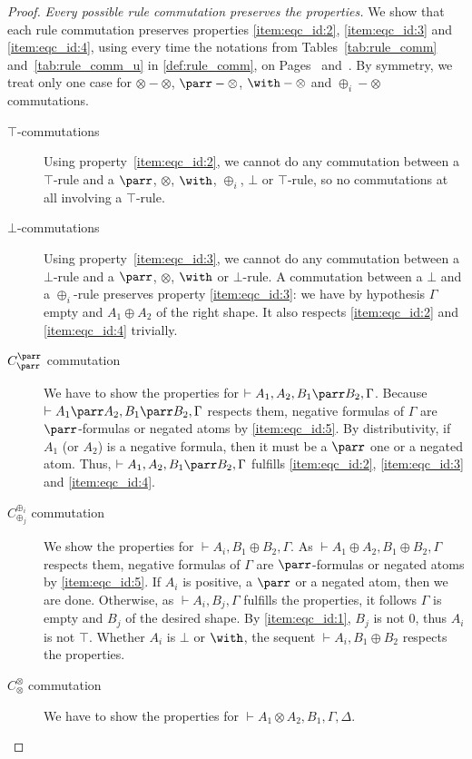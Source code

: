 \documentclass{lmcs}
\newcommand*{\tens}{\otimes} %
\renewcommand*{\fCenter}{\vdash} %
\newcommand{\comm}[2]{C_{#1}^{#2}} %
\newcommand*{\proofpar}[1]{\textit{#1}}
\begin{document}
\begin{proof}
\proofpar{Every possible rule commutation preserves the properties.}
We show that each rule commutation preserves properties \ref{item:eqc_id:2}, \ref{item:eqc_id:3} and \ref{item:eqc_id:4}, using every time the notations from Tables~\ref{tab:rule_comm} and~\ref{tab:rule_comm_u} in \autoref{def:rule_comm}, on Pages~\pageref{tab:rule_comm} and~\pageref{tab:rule_comm_u}.
By symmetry, we treat only one case for $\tens-\tens$, $\parr-\tens$, $\with-\tens$ and $\oplus_i-\tens$ commutations.
\begin{description}
\item[$\top$-commutations]
Using property~\ref{item:eqc_id:2}, we cannot do any commutation between a $\top$-rule and a $\parr$, $\tens$, $\with$, $\oplus_i$, $\bot$ or $\top$-rule, so no commutations at all involving a $\top$-rule.
\item[$\bot$-commutations]
Using property~\ref{item:eqc_id:3}, we cannot do any commutation between a $\bot$-rule and a $\parr$, $\tens$, $\with$ or $\bot$-rule.
A commutation between a $\bot$ and a $\oplus_i$-rule preserves property \ref{item:eqc_id:3}: we have by hypothesis $\Gamma$ empty and $A_1\oplus A_2$ of the right shape.
It also respects \ref{item:eqc_id:2} and \ref{item:eqc_id:4} trivially.
\item[$\comm{\parr}{\parr}$ commutation]
We have to show the properties for $\fCenter A_1,A_2,B_1\parr B_2,\Gamma$.
Because $\fCenter A_1\parr A_2,B_1\parr B_2,\Gamma$ respects them, negative formulas of $\Gamma$ are $\parr$-formulas or negated atoms by \ref{item:eqc_id:5}.
By distributivity, if $A_1$ (or $A_2$) is a negative formula, then it must be a $\parr$ one or a negated atom.
Thus, $\fCenter A_1,A_2,B_1\parr B_2,\Gamma$ fulfills \ref{item:eqc_id:2}, \ref{item:eqc_id:3} and \ref{item:eqc_id:4}.
\item[$\comm{\oplus_j}{\oplus_i}$ commutation]
We show the properties for $\fCenter A_i,B_1\oplus B_2,\Gamma$.
As $\fCenter A_1\oplus A_2,B_1\oplus B_2,\Gamma$ respects them, negative formulas of $\Gamma$ are $\parr$-formulas or negated atoms by \ref{item:eqc_id:5}.
If $A_i$ is positive, a $\parr$ or a negated atom, then we are done.
Otherwise, as $\fCenter A_i,B_j,\Gamma$ fulfills the properties, it follows $\Gamma$ is empty and $B_j$ of the desired shape.
By \ref{item:eqc_id:1}, $B_j$ is not $0$, thus $A_i$ is not $\top$.
Whether $A_i$ is $\bot$ or $\with$, the sequent $\fCenter A_i, B_1\oplus B_2$ respects the properties.
\item[$\comm{\tens}{\tens}$ commutation]
We have to show the properties for $\fCenter A_1\tens A_2,B_1,\Gamma,\Delta$.

\end{description}
\end{proof}
\end{document}
